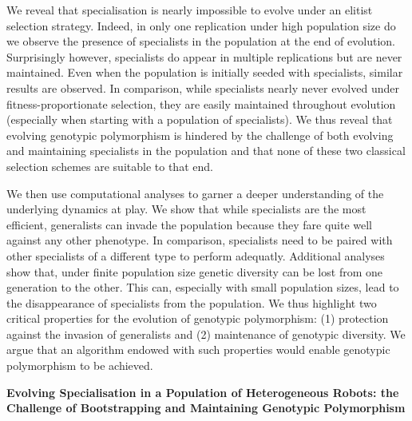 We reveal that specialisation is nearly impossible to evolve under an elitist selection strategy. Indeed, in only one replication under high population size do we observe the presence of specialists in the population at the end of evolution. Surprisingly however, specialists do appear in multiple replications but are never maintained. Even when the population is initially seeded with specialists, similar results are observed. In comparison, while specialists nearly never evolved under fitness-proportionate selection, they are easily maintained throughout evolution (especially when starting with a population of specialists). We thus reveal that evolving genotypic polymorphism is hindered by the challenge of both evolving and maintaining specialists in the population and that none of these two classical selection schemes are suitable to that end.

We then use computational analyses to garner a deeper understanding of the underlying dynamics at play. We show that while specialists are the most efficient, generalists can invade the population because they fare quite well against any other phenotype. In comparison, specialists need to be paired with other specialists of a different type to perform adequatly. Additional analyses show that, under finite population size genetic diversity can be lost from one generation to the other. This can, especially with small population sizes, lead to the disappearance of specialists from the population. We thus highlight two critical properties for the evolution of genotypic polymorphism: (1) protection against the invasion of generalists and (2) maintenance of genotypic diversity. We argue that an algorithm endowed with such properties would enable genotypic polymorphism to be achieved.

\clearpage

\begin{flushleft}
\textbf{\Huge Evolving Specialisation in a Population of Heterogeneous Robots: the Challenge of Bootstrapping and Maintaining Genotypic Polymorphism}
\end{flushleft}


